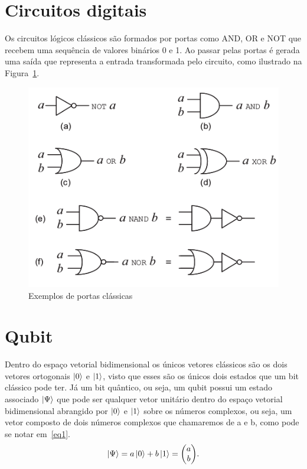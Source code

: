 \documentclass[a4paper, 12pt, oneside]{book}
\begin{document}
\section{Circuitos digitais}
Os circuitos lógicos clássicos são formados por portas como AND, OR e NOT que recebem uma sequência de valores binários 0 e 1. Ao passar pelas portas é gerada uma saída que representa a entrada transformada pelo circuito, como ilustrado na Figura~\ref{fig:classiccircuit}.

\begin{figure}[H]
\centering
\includegraphics[scale=0.5]{classiccircuit.png}
\caption{Exemplos de portas clássicas}
\label{fig:classiccircuit}
\end{figure}

\section{Qubit}
Dentro do espaço vetorial bidimensional os únicos vetores clássicos são os dois vetores ortogonais $\ket{0}$ e $\ket{1}$, visto que esses são os únicos dois estados que um bit clássico pode ter. Já um bit quântico, ou seja, um qubit possui um estado associado $\ket{\Psi}$ que pode ser qualquer vetor unitário dentro do espaço vetorial bidimensional abrangido por $\ket{0}$ e $\ket{1}$ sobre os números complexos, ou seja, um vetor composto de dois números complexos que chamaremos de a e b, como pode se notar em~\eqref{eq1}.
\begin{equation} \label{eq1} 
\ket{\Psi} = a\ket{0} + b\ket{1} = \mqty(a\\b).
\end{equation}
\end{document}
